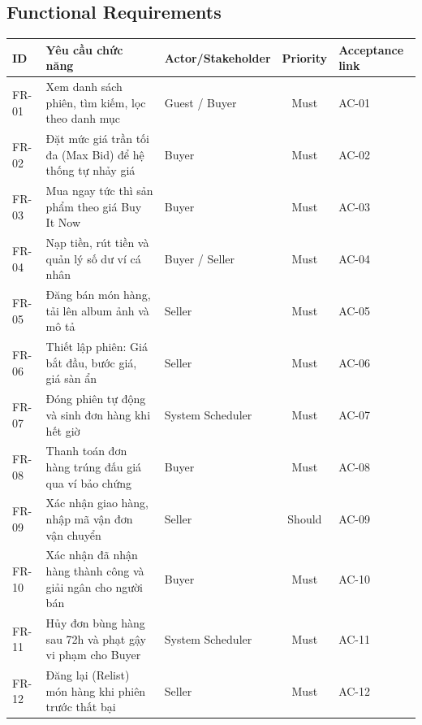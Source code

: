 \documentclass[11pt,a4paper]{article}
\begin{document}
\subsection{Functional Requirements}
\begin{table}[H]
    \centering
    \small
    \begin{tabularx}{\textwidth}{|l|X|l|c|l|}
        \hline
        \textbf{ID} & \textbf{Yêu cầu chức năng} & \textbf{Actor/Stakeholder} & \textbf{Priority} & \textbf{Acceptance link} \\ \hline
        FR-01 & Xem danh sách phiên, tìm kiếm, lọc theo danh mục & Guest / Buyer & Must & AC-01 \\ \hline
        FR-02 & Đặt mức giá trần tối đa (Max Bid) để hệ thống tự nhảy giá & Buyer & Must & AC-02 \\ \hline
        FR-03 & Mua ngay tức thì sản phẩm theo giá Buy It Now & Buyer & Must & AC-03 \\ \hline
        FR-04 & Nạp tiền, rút tiền và quản lý số dư ví cá nhân & Buyer / Seller & Must & AC-04 \\ \hline
        FR-05 & Đăng bán món hàng, tải lên album ảnh và mô tả & Seller & Must & AC-05 \\ \hline
        FR-06 & Thiết lập phiên: Giá bắt đầu, bước giá, giá sàn ẩn & Seller & Must & AC-06 \\ \hline
        FR-07 & Đóng phiên tự động và sinh đơn hàng khi hết giờ & System Scheduler & Must & AC-07 \\ \hline
        FR-08 & Thanh toán đơn hàng trúng đấu giá qua ví bảo chứng & Buyer & Must & AC-08 \\ \hline
        FR-09 & Xác nhận giao hàng, nhập mã vận đơn vận chuyển & Seller & Should & AC-09 \\ \hline
        FR-10 & Xác nhận đã nhận hàng thành công và giải ngân cho người bán & Buyer & Must & AC-10 \\ \hline
        FR-11 & Hủy đơn bùng hàng sau 72h và phạt gậy vi phạm cho Buyer & System Scheduler & Must & AC-11 \\ \hline
        FR-12 & Đăng lại (Relist) món hàng khi phiên trước thất bại & Seller & Must & AC-12 \\ \hline
    \end{tabularx}
\end{table}
\end{document}
